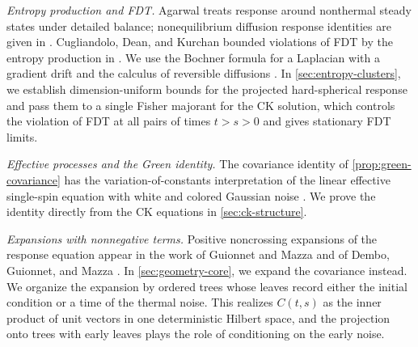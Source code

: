 \emph{Entropy production and FDT.} Agarwal \cite{agarwal1972} treats response around nonthermal steady states under detailed balance; nonequilibrium diffusion response identities are given in \cite{bmw2009}. Cugliandolo, Dean, and Kurchan bounded violations of FDT by the entropy production in \cite[arXiv version~2, Equations~(12)--(14) and~(18)]{cdk1997}. We use the Bochner formula for a Laplacian with a gradient drift \cite[Proposition~3]{bakryemery1985} and the calculus of reversible diffusions \cite{bgl2014}. In \cref{sec:entropy-clusters}, we establish dimension-uniform bounds for the projected hard-spherical response and pass them to a single Fisher majorant for the CK solution, which controls the violation of FDT at all pairs of times $t>s>0$ and gives stationary FDT limits.

\emph{Effective processes and the Green identity.} The covariance identity of \cref{prop:green-covariance} has the variation-of-constants interpretation of the linear effective single-spin equation with white and colored Gaussian noise \cite[arXiv version~2, Section~9.5, Equation~(9.56), p.~55]{cugliandolo2004}. We prove the identity directly from the CK equations in \cref{sec:ck-structure}.

\emph{Expansions with nonnegative terms.} Positive noncrossing expansions of the response equation appear in the work of Guionnet and Mazza \cite[Section~2.1]{guionnetmazza2005} and of Dembo, Guionnet, and Mazza \cite[Section~2]{dgm2007}. In \cref{sec:geometry-core}, we expand the covariance instead. We organize the expansion by ordered trees whose leaves record either the initial condition or a time of the thermal noise. This realizes $C(t,s)$ as the inner product of unit vectors in one deterministic Hilbert space, and the projection onto trees with early leaves plays the role of conditioning on the early noise.

